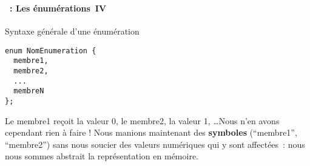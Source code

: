 \begin{frame}[containsverbatim]
  \frametitle{\secname}
  \framesubtitle{\subsecname~: Les énumérations~IV} 

  \begin{block}{Syntaxe générale d'une énumération}
    \begin{verbatim}
enum NomEnumeration {
  membre1,
  membre2,
  ...
  membreN
}; \end{verbatim}   
  \end{block}
  \vspace{0.3cm}
  \par
  Le membre1 reçoit la valeur 0, le membre2, la valeur 1, \ldots Nous n'en avons cependant rien à faire ! Nous manions
  maintenant des \textbf{symboles} (``membre1'', ``membre2'') sans nous soucier des valeurs numériques qui y sont 
  affectées~: nous nous sommes abstrait la représentation en mémoire.
\end{frame}

